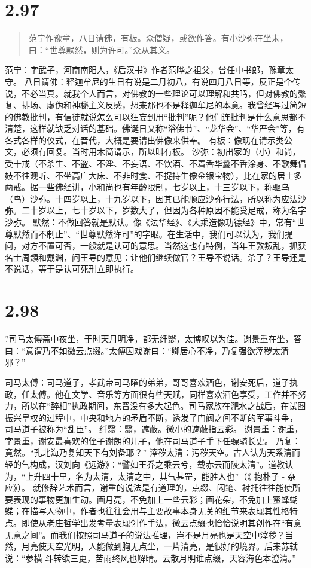 \documentclass[]{book}
\begin{document}
\section{2.97}\label{section-143}

\begin{quote}
范宁作豫章，八日请佛，有板。众僧疑，或欲作答。有小沙弥在坐末，曰：``世尊默然，则为许可。''众从其义。
\end{quote}

范宁：字武子，河南南阳人，《后汉书》作者范晔之祖父，曾任中书郎，豫章太守。
八日请佛：释迦牟尼的生日有说是二月初八，有说四月八日等，反正是个传说，不必当真。就我个人而言，对佛教的一些理论可以理解和共鸣，但对佛教的繁复、排场、虚伪和神秘主义反感，想来那也不是释迦牟尼的本意。我曾经写过简短的佛教批判，有信徒就说怎么可以狂妄到用``批判''呢？他们连批判是什么意思都不清楚，这样就缺乏对话的基础。佛诞日又称``浴佛节''、``龙华会''、``华严会''等，有各式各样的仪式，在晋代，大概是要请出佛像来供奉。
有板：像现在请示类公文，必须有回复。当时用木简请示，所以叫有板。
沙弥：初出家的（小）和尚，受十戒（不杀生、不盗、不淫、不妄语、不饮酒、不着香华鬘不香涂身、不歌舞倡妓不往观听、不坐高广大床、不非时食、不捉持生像金银宝物），比在家的居士多两戒。据一些佛经讲，小和尚也有年龄限制，七岁以上，十三岁以下，称驱乌（鸟）沙弥。十四岁以上，十九岁以下，因其已能顺应沙弥行法，所以称为应法沙弥。二十岁以上，七十岁以下，岁数大了，但因为各种原因不能受足戒，称为名字沙弥。
默然：不做回答就是默认。像《法华经》、《大乘造像功德经》中，常有``世尊默然而不制止''、``世尊默然许可''的字眼。在生活中，我们可以认为，我们提问，对方不置可否，一般就是认可的意思。当然这也有特例，当年王敦叛乱，抓获名士周顗和戴渊，问王导的意见：让他们继续做官？王导不说话。杀了？王导还是不说话，等于是认可死刑立即执行。

\section{2.98}\label{section-144}

?司马太傅斋中夜坐，于时天月明净，都无纤翳，太博叹以为佳。谢景重在坐，答曰：``意谓乃不如微云点缀。''太傅因戏谢曰：``卿居心不净，乃复强欲滓秽太清邪？''

司马太傅：司马道子，孝武帝司马曜的弟弟，哥哥喜欢酒色，谢安死后，道子执政，任太傅。他在文学、音乐等方面很有些天赋，同样喜欢酒色享受，工作并不努力，所以在``醉相''执政期间，东晋没有多大起色。司马家族在淝水之战后，在试图振兴皇权的过程中，中央和地方的矛盾不断，诱发了门阀之间不断的军事斗争，
司马道子被称为``乱臣''。 纤翳：翳，遮蔽。微小的遮蔽指云彩。
谢景重：谢重，字景重，谢安最喜欢的侄子谢朗的儿子，他在司马道子手下任骠骑长史。
乃复：竟然。``孔北海乃复知天下有刘备耶？''
滓秽太清：污秽天空。古人认为天系清而轻的气构成，汉刘向《远游》：``譬如王乔之乘云兮，载赤云而陵太清''。道教认为，``上升四十里，名为太清，太清之中，其气甚罡，能胜人也''（《
抱朴子 - 杂应》）。
就修辞艺术而言，谢重的说法是有道理的，点缀、闲笔、衬托往往能使所要表现的事物更加生动。画月亮，不免加上一些云彩；画花朵，不免加上蜜蜂蝴蝶；在描写人物中，作者也往往会用与主要故事本身无关的细节来表现其性格特点。即使从老庄哲学出发考量表现创作手法，微云点缀也恰恰说明其创作在``有意无意之间''。而我们按照司马道子的说法推理，岂不是月亮也是天空中滓秽？当然，月亮使天空光明，人能做到胸无点尘，一片清亮，是很好的境界。后来苏轼说：``参横
斗转欲三更，苦雨终风也解晴。云散月明谁点缀，天容海色本澄清。''
\end{document}
